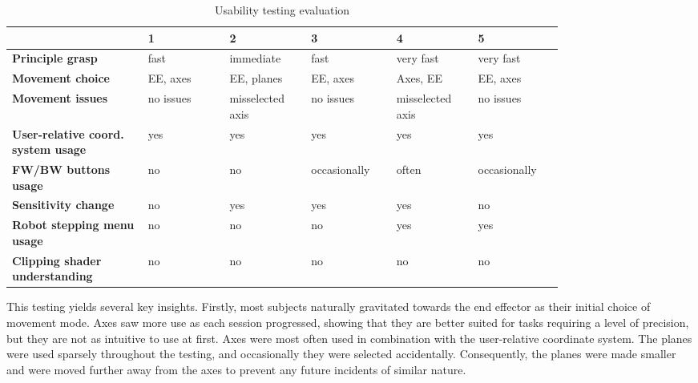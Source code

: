 \begin{table}[h!]
    \centering
    \begin{tabular}{|p{0.2\linewidth}|p{0.12\linewidth}|p{0.12\linewidth}|p{0.12\linewidth}|p{0.12\linewidth}|p{0.12\linewidth}|}
         \hline
         & 1 & 2 & 3 & 4 & 5   \\
         
         \hline
         \textbf{Principle grasp} & fast & immediate & fast & very fast & very fast \\
         
         \hline
         \textbf{Movement choice} & EE, axes & EE, planes & EE, axes & Axes, EE & EE, axes \\

         \hline
         \textbf{Movement issues} & no issues & misselected axis & no issues & misselected axis & no issues \\

         \hline
         \textbf{User-relative coord. system usage} & yes & yes & yes & yes & yes \\
         
         \hline
         \textbf{FW/BW buttons usage} & no & no & occasionally & often & occasionally \\
         
         \hline
         \textbf{Sensitivity change} & no & yes & yes & yes & no \\

         \hline
         \textbf{Robot stepping menu usage} & no & no & no & yes & yes \\

         \hline
         \textbf{Clipping shader understanding} & no & no & no & no & no \\
         
         \hline
         
    \end{tabular}
    \caption{Usability testing evaluation}
    \label{tab:testing}
\end{table}

This testing yields several key insights. Firstly, most subjects naturally gravitated towards the end effector as their initial choice of movement mode. Axes saw more use as each session progressed, showing that they are better suited for tasks requiring a level of precision, but they are not as intuitive to use at first. Axes were most often used in combination with the user-relative coordinate system. The planes were used sparsely throughout the testing, and occasionally they were selected accidentally. Consequently, the planes were made smaller and were moved further away from the axes to prevent any future incidents of similar nature. 

